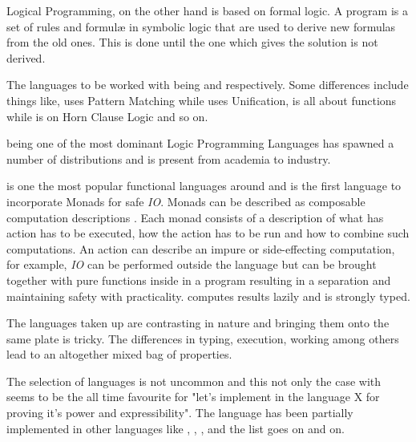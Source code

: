 \documentclass[proposal.tex]{subfiles}
\begin{document}
\par Logical Programming, \cite{spivey1995introduction} on the other hand is based on formal logic. A program is a 
set of rules and formul\ae{} in symbolic logic that are used to derive new formulas from the old ones. This is done 
until the one which gives the solution is not derived.  

\par The languages to be worked with being  and  respectively. Some 
differences include things like,  uses Pattern Matching while  uses 
Unification,  is all about functions while  is on Horn Clause Logic and so on.  

\par {} \cite{wikiprolog} being one of the most dominant Logic Programming Languages has 
spawned a number of distributions and is present from academia to industry.  

\par {} is one the most popular \cite{website:langpop} functional languages around and is the 
first language to incorporate Monads \cite{wadler1992comprehending} for safe \textit{IO}. Monads can be 
described as composable computation descriptions \cite{website:monadshaskellorg} . Each monad consists of a 
description of what has action has to be executed, how the action has to be run and how to combine such 
computations. An action can describe an impure or side-effecting computation, for example, \textit{IO} can be 
performed outside the language but can be brought together with pure functions inside in a program resulting in a 
separation and maintaining safety with practicality.  computes results lazily and is strongly 
typed. 

\par The languages taken up are contrasting in nature and bringing them onto the same plate is tricky. The 
differences in typing, execution, working among others lead to an altogether mixed bag of properties.

\par The selection of languages is not uncommon and this not only the case with  seems 
to be the all time favourite for "let's implement  in the language X for proving it's power and 
expressibility". The  language has been partially implemented \cite{swipembedd} in other 
languages like  \cite{racklog},   
\cite{komorowski1982qlog,robinson1982loglisp,robinson1980loglisp},  \cite{wikiprolog, jlog}, 
 \cite{jscriptlog} and the list \cite{yieldprolog} goes on and on.    
\end{document}
